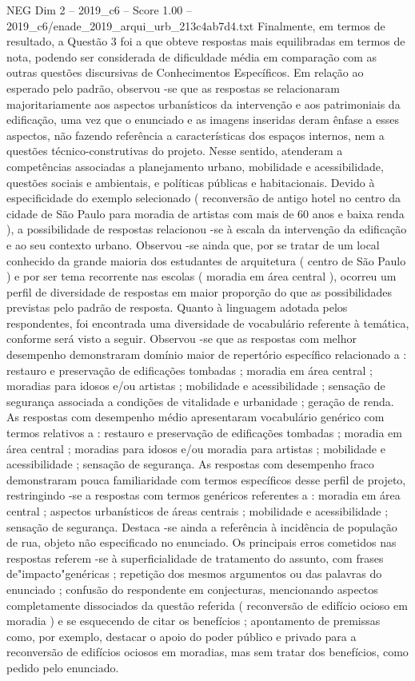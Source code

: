 \begin{textsample}{NEG Dim 2 – 2019\_c6 – Score 1.00 – 2019\_c6/enade\_2019\_arqui\_urb\_213c4ab7d4.txt}
Finalmente, em termos de resultado, a Questão 3 foi a que obteve respostas mais equilibradas em termos de nota, podendo ser considerada de dificuldade média em comparação com as outras questões discursivas de Conhecimentos Específicos.
Em relação ao esperado pelo padrão, observou -se que as respostas se relacionaram majoritariamente aos aspectos urbanísticos da intervenção e aos patrimoniais da edificação, uma vez que o enunciado e as imagens inseridas deram ênfase a esses aspectos, não fazendo referência a características dos espaços internos, nem a questões técnico-construtivas do projeto.
Nesse sentido, atenderam a competências associadas a planejamento urbano, mobilidade e acessibilidade, questões sociais e ambientais, e políticas públicas e habitacionais.
Devido à especificidade do exemplo selecionado ( reconversão de antigo hotel no centro da cidade de São Paulo para moradia de artistas com mais de 60 anos e baixa renda ), a possibilidade de respostas relacionou -se à escala da intervenção da edificação e ao seu contexto urbano.
Observou -se ainda que, por se tratar de um local conhecido da grande maioria dos estudantes de arquitetura ( centro de São Paulo ) e por ser tema recorrente nas escolas ( moradia em área central ), ocorreu um perfil de diversidade de respostas em maior proporção do que as possibilidades previstas pelo padrão de resposta.
Quanto à linguagem adotada pelos respondentes, foi encontrada uma diversidade de vocabulário referente à temática, conforme será visto a seguir.
Observou -se que as respostas com melhor desempenho demonstraram domínio maior de repertório específico relacionado a : restauro e preservação de edificações tombadas ; moradia em área central ; moradias para idosos e/ou artistas ; mobilidade e acessibilidade ; sensação de segurança associada a condições de vitalidade e urbanidade ; geração de renda.
As respostas com desempenho médio apresentaram vocabulário genérico com termos relativos a : restauro e preservação de edificações tombadas ; moradia em área central ; moradias para idosos e/ou moradia para artistas ; mobilidade e acessibilidade ; sensação de segurança.
As respostas com desempenho fraco demonstraram pouca familiaridade com termos específicos desse perfil de projeto, restringindo -se a respostas com termos genéricos referentes a : moradia em área central ; aspectos urbanísticos de áreas centrais ; mobilidade e acessibilidade ; sensação de segurança.
Destaca -se ainda a referência à incidência de população de rua, objeto não especificado no enunciado.
Os principais erros cometidos nas respostas referem -se à superficialidade de tratamento do assunto, com frases de"impacto"genéricas ; repetição dos mesmos argumentos ou das palavras do enunciado ; confusão do respondente em conjecturas, mencionando aspectos completamente dissociados da questão referida ( reconversão de edifício ocioso em moradia ) e se esquecendo de citar os benefícios ; apontamento de premissas como, por exemplo, destacar o apoio do poder público e privado para a reconversão de edifícios ociosos em moradias, mas sem tratar dos benefícios, como pedido pelo enunciado.

\end{textsample}
